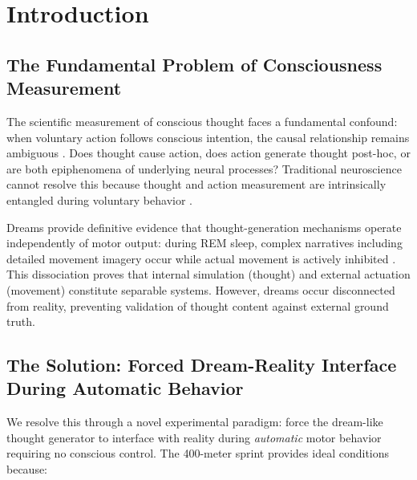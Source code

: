 \documentclass[12pt,twocolumn]{article}
\theoremstyle{remark}
\begin{document}
\begin{abstract}
\textbf{Keywords:} consciousness measurement, thought validation, dream-reality interface, automatic motor substrate, oscillatory perturbation analysis, biological Maxwell demons, atmospheric oxygen coupling, skeleton stability, mind-body dualism, trans-Planckian precision
\end{abstract}

\section{Introduction}

\subsection{The Fundamental Problem of Consciousness Measurement}

The scientific measurement of conscious thought faces a fundamental confound: when voluntary action follows conscious intention, the causal relationship remains ambiguous \citep{libet1983time,wegner2002illusion}. Does thought cause action, does action generate thought post-hoc, or are both epiphenomena of underlying neural processes? Traditional neuroscience cannot resolve this because thought and action measurement are intrinsically entangled during voluntary behavior \citep{haggard2008human}.

Dreams provide definitive evidence that thought-generation mechanisms operate independently of motor output: during REM sleep, complex narratives including detailed movement imagery occur while actual movement is actively inhibited \citep{hobson2009rem}. This dissociation proves that internal simulation (thought) and external actuation (movement) constitute separable systems. However, dreams occur disconnected from reality, preventing validation of thought content against external ground truth.

\subsection{The Solution: Forced Dream-Reality Interface During Automatic Behavior}

We resolve this through a novel experimental paradigm: force the dream-like thought generator to interface with reality during \textit{automatic} motor behavior requiring no conscious control. The 400-meter sprint provides ideal conditions because:
\end{document}
